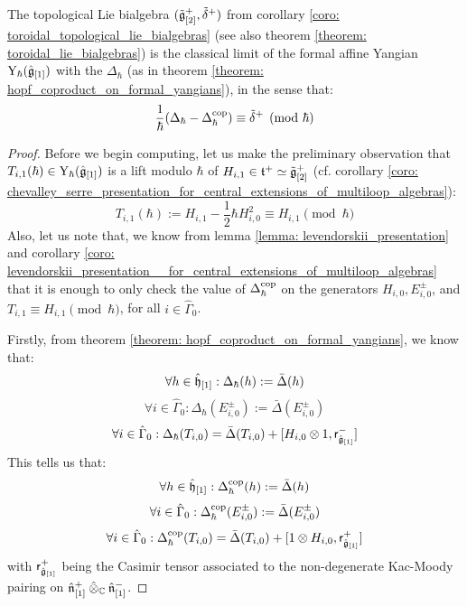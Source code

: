         \begin{theorem} \label{theorem: toroidal_lie_algebras_as_classical_limits_of_formal_affine_yangians}
           The topological Lie bialgebra $(\tilde{\mathfrak{g}}_{[2]}^+, \tilde{\delta}^+)$ from corollary \ref{coro: toroidal_topological_lie_bialgebras} (see also theorem \ref{theorem: toroidal_lie_bialgebras}) is the classical limit of the formal affine Yangian $\mathrm{Y}_{\hbar}(\hat{\mathfrak{g}}_{[1]})$ with the  $\Delta_{\hbar}$ (as in theorem \ref{theorem: hopf_coproduct_on_formal_yangians}), in the sense that:
                $$\frac{1}{\hbar}( \Delta_{\hbar} - \Delta_{\hbar}^{\mathrm{cop}} ) \equiv \tilde{\delta}^+ \pmod{\hbar}$$
        \end{theorem}
            \begin{proof}
                Before we begin computing, let us make the preliminary observation that $T_{i, 1}(\hbar) \in \mathrm{Y}_{\hbar}(\hat{\mathfrak{g}}_{[1]})$ is a lift modulo $\hbar$ of $H_{i, 1} \in \mathfrak{t}^+ \simeq \tilde{\mathfrak{g}}_{[2]}^+$ (cf. corollary \ref{coro: chevalley_serre_presentation_for_central_extensions_of_multiloop_algebras}):
                    $$T_{i, 1}(\hbar) := H_{i, 1} - \frac12 \hbar H_{i, 0}^2 \equiv H_{i, 1} \pmod{\hbar}$$
                Also, let us note that, we know from lemma \ref{lemma: levendorskii_presentation} and corollary \ref{coro: levendorskii_presentation__for_central_extensions_of_multiloop_algebras} that it is enough to only check the value of $\Delta_{\hbar}^{\mathrm{cop}}$ on the generators $H_{i, 0}, E_{i, 0}^{\pm}$, and $T_{i, 1} \equiv H_{i, 1} \pmod{\hbar}$, for all $i \in \hat{\Gamma}_0$.
            
                Firstly, from theorem \ref{theorem: hopf_coproduct_on_formal_yangians}, we know that:
                    $$\forall h \in \hat{\mathfrak{h}}_{[1]}: \Delta_{\hbar}(h) := \bar{\Delta}(h)$$
                    $$\forall i \in \hat{\Gamma}_0: \Delta_{\hbar}(E_{i, 0}^{\pm}) := \bar{\Delta}(E_{i, 0}^{\pm})$$
                    $$\forall i \in \hat{\Gamma}_0: \Delta_{\hbar}(T_{i, 0}) = \bar{\Delta}(T_{i, 0}) + [H_{i, 0} \tensor 1, \sfr_{ \hat{\g}_{[1]} }^-]$$
                This tells us that:
                    $$\forall h \in \hat{\mathfrak{h}}_{[1]}: \Delta_{\hbar}^{\mathrm{cop}}(h) := \bar{\Delta}(h)$$
                    $$\forall i \in \hat{\Gamma}_0: \Delta_{\hbar}^{\mathrm{cop}}(E_{i, 0}^{\pm}) := \bar{\Delta}(E_{i, 0}^{\pm})$$
                    $$\forall i \in \hat{\Gamma}_0: \Delta_{\hbar}^{\cop}(T_{i, 0}) = \bar{\Delta}(T_{i, 0}) + [1 \tensor H_{i, 0}, \sfr_{ \hat{\g}_{[1]} }^+]$$
                with $\mathsf{r}_{\hat{\mathfrak{g}}_{[1]}}^+$ being the Casimir tensor associated to the non-degenerate Kac-Moody pairing on $\hat{\n}_{[1]}^+ \hattensor_{\bbC} \hat{\n}_{[1]}^-$.


\end{proof}
